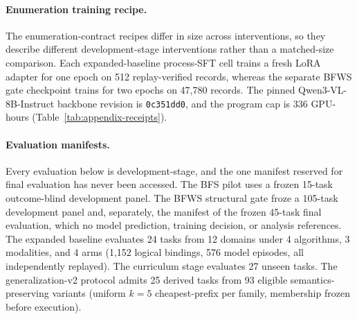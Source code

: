 \paragraph{Enumeration training recipe.}
The enumeration-contract recipes differ in size across interventions, so they describe different development-stage interventions rather than a matched-size comparison. Each expanded-baseline process-SFT cell trains a fresh LoRA adapter for one epoch on 512 replay-verified records, whereas the separate BFWS gate checkpoint trains for two epochs on 47,780 records. The pinned Qwen3-VL-8B-Instruct backbone revision is \texttt{0c351dd0}, and the program cap is 336 GPU-hours (Table~\ref{tab:appendix-receipts}).

\paragraph{Evaluation manifests.}
Every evaluation below is development-stage, and the one manifest reserved for final evaluation has never been accessed. The BFS pilot uses a frozen 15-task outcome-blind development panel. The BFWS structural gate froze a 105-task development panel and, separately, the manifest of the frozen 45-task final evaluation, which no model prediction, training decision, or analysis references. The expanded baseline evaluates 24 tasks from 12 domains under 4 algorithms, 3 modalities, and 4 arms (1,152 logical bindings, 576 model episodes, all independently replayed). The curriculum stage evaluates 27 unseen tasks. The generalization-v2 protocol admits 25 derived tasks from 93 eligible semantics-preserving variants (uniform $k{=}5$ cheapest-prefix per family, membership frozen before execution).


